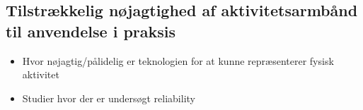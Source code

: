 \subsection{Tilstrækkelig nøjagtighed af aktivitetsarmbånd til anvendelse i praksis}
\begin{itemize}
\item Hvor nøjagtig/pålidelig er teknologien for at kunne repræsenterer fysisk aktivitet
\item Studier hvor der er undersøgt reliability
\end{itemize}